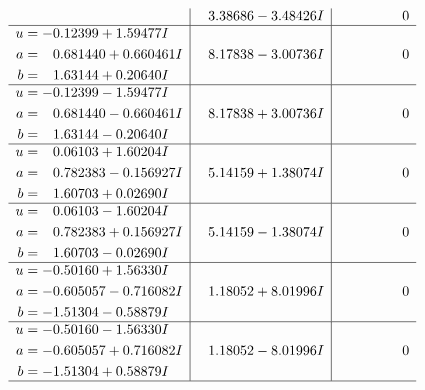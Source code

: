 \documentclass[1p]{elsarticle_modified}
\theoremstyle{definition}
\begin{document}
$$\begin{array}{c|c|c}
 & \phantom{-}3.38686 - 3.48426 I & \phantom{-0.000000 } 0 \\ \hline\begin{aligned}
u &= -0.12399 + 1.59477 I \\
a &= \phantom{-}0.681440 + 0.660461 I \\
b &= \phantom{-}1.63144 + 0.20640 I\end{aligned}
 & \phantom{-}8.17838 - 3.00736 I & \phantom{-0.000000 } 0 \\ \hline\begin{aligned}
u &= -0.12399 - 1.59477 I \\
a &= \phantom{-}0.681440 - 0.660461 I \\
b &= \phantom{-}1.63144 - 0.20640 I\end{aligned}
 & \phantom{-}8.17838 + 3.00736 I & \phantom{-0.000000 } 0 \\ \hline\begin{aligned}
u &= \phantom{-}0.06103 + 1.60204 I \\
a &= \phantom{-}0.782383 - 0.156927 I \\
b &= \phantom{-}1.60703 + 0.02690 I\end{aligned}
 & \phantom{-}5.14159 + 1.38074 I & \phantom{-0.000000 } 0 \\ \hline\begin{aligned}
u &= \phantom{-}0.06103 - 1.60204 I \\
a &= \phantom{-}0.782383 + 0.156927 I \\
b &= \phantom{-}1.60703 - 0.02690 I\end{aligned}
 & \phantom{-}5.14159 - 1.38074 I & \phantom{-0.000000 } 0 \\ \hline\begin{aligned}
u &= -0.50160 + 1.56330 I \\
a &= -0.605057 - 0.716082 I \\
b &= -1.51304 - 0.58879 I\end{aligned}
 & \phantom{-}1.18052 + 8.01996 I & \phantom{-0.000000 } 0 \\ \hline\begin{aligned}
u &= -0.50160 - 1.56330 I \\
a &= -0.605057 + 0.716082 I \\
b &= -1.51304 + 0.58879 I\end{aligned}
 & \phantom{-}1.18052 - 8.01996 I & \phantom{-0.000000 } 0\\
 \hline 
 \end{array}$$\newpage$$\begin{array}{c|c|c}  

\end{array}$$
\end{document}
